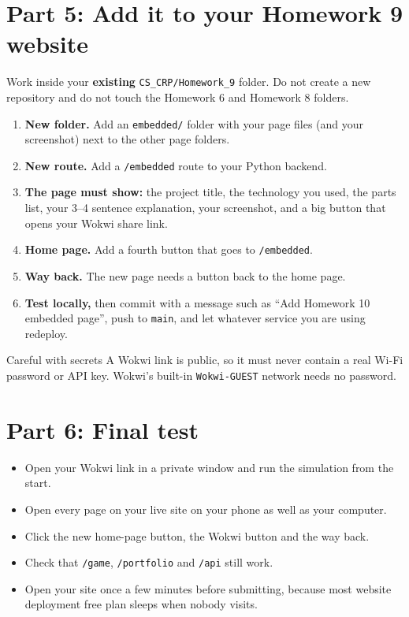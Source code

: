 \documentclass[11pt,a4paper]{article}
\begin{document}
\section*{Part 5: Add it to your Homework 9 website}
Work inside your \textbf{existing} \texttt{CS\_CRP/Homework\_9} folder. Do not create a new repository and do not touch the Homework 6 and Homework 8 folders.
\begin{enumerate}
\item \textbf{New folder.} Add an \texttt{embedded/} folder with your page files (and your screenshot) next to the other page folders.
\item \textbf{New route.} Add a \texttt{/embedded} route to your Python backend.
\item \textbf{The page must show:} the project title, the technology you used, the parts list, your 3--4 sentence explanation, your screenshot, and a big button that opens your Wokwi share link.
\item \textbf{Home page.} Add a fourth button that goes to \texttt{/embedded}.
\item \textbf{Way back.} The new page needs a button back to the home page.
\item \textbf{Test locally,} then commit with a message such as ``Add Homework 10 embedded page'', push to \texttt{main}, and let whatever service you are using redeploy.
\end{enumerate}

\begin{note}{Careful with secrets}
A Wokwi link is public, so it must never contain a real Wi-Fi password or API key. Wokwi's built-in \texttt{Wokwi-GUEST} network needs no password.
\end{note}

\section*{Part 6: Final test}
\begin{itemize}
\item Open your Wokwi link in a private window and run the simulation from the start.
\item Open every page on your live site on your phone as well as your computer.
\item Click the new home-page button, the Wokwi button and the way back.
\item Check that \texttt{/game}, \texttt{/portfolio} and \texttt{/api} still work.
\item Open your site once a few minutes before submitting, because most website deployment free plan sleeps when nobody visits.
\end{itemize}
\end{document}
